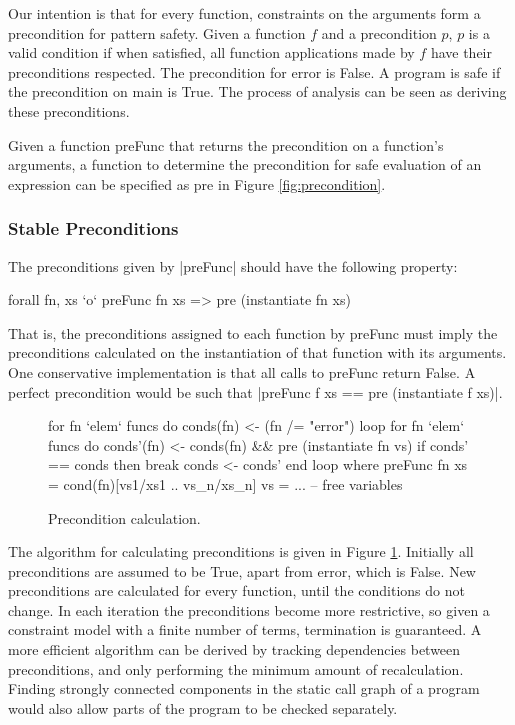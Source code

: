 \documentclass[preprint]{sigplanconf}
\newcommand{\C}[1]{\textsf{#1}}
\newenvironment{discuss}
    {\noindent\hspace{-1.5mm}\vline\hspace{1mm}\vline\hspace{1mm}\begin{minipage}[h]{\linewidth}}
    {\end{minipage}}
\begin{document}
Our intention is that for every function, constraints on the arguments form a precondition for pattern safety. Given a function $f$ and a precondition $p$, $p$ is a valid condition if when satisfied, all function applications made by $f$ have their preconditions respected. The precondition for \C{error} is False. A program is safe if the precondition on \C{main} is True. The process of analysis can be seen as deriving these preconditions.

Given a function \C{preFunc} that returns the precondition on a function's arguments, a function to determine the precondition for safe evaluation of an expression can be specified as \C{pre} in Figure \ref{fig:precondition}.

\subsubsection{Stable Preconditions}

\begin{discuss}
The preconditions given by |preFunc| should have the following property:

\begin{code}
forall fn, xs `o` preFunc fn xs => pre (instantiate fn xs)
\end{code}

That is, the preconditions assigned to each function by \C{preFunc} must imply the preconditions calculated on the instantiation of that function with its arguments. One conservative implementation is that all calls to \C{preFunc} return False. A perfect precondition would be such that |preFunc f xs == pre (instantiate f xs)|.
\end{discuss}

\begin{figure}
\begin{code}
for fn `elem` funcs do conds(fn) <- (fn /= "error")
loop
    for fn `elem` funcs do
        conds'(fn) <- conds(fn) && pre (instantiate fn vs)
    if conds' == conds then break
    conds <- conds'
end loop
    where
        preFunc fn xs = cond(fn)[vs1/xs1 .. vs_n/xs_n]
        vs = ... -- free variables
\end{code}
\caption{Precondition calculation.}
\label{fig:precond_fixp}
\end{figure}

The algorithm for calculating preconditions is given in Figure \ref{fig:precond_fixp}. Initially all preconditions are assumed to be True, apart from \C{error}, which is False. New preconditions are calculated for every function, until the conditions do not change. In each iteration the preconditions become more restrictive, so given a constraint model with a finite number of terms, termination is guaranteed. A more efficient algorithm can be derived by tracking dependencies between preconditions, and only performing the minimum amount of recalculation. Finding strongly connected components in the static call graph of a program would also allow parts of the program to be checked separately.
\end{document}

